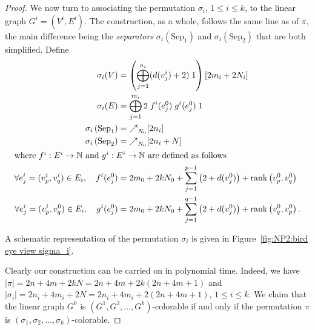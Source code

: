 \begin{proof}
  We now turn to associating the permutation $\sigma_i$, $1 \leq i \leq k$,
  to the linear graph $G^i = (V^i, E^i)$.
  The construction, as a whole, follows the same line as of $\pi$,
  the main difference being the \emph{separators}
  $\sigma_i\left(\text{Sep}_1\right)$ and
  $\sigma_i\left(\text{Sep}_2\right)$ that are both simplified.
  Define
  \begin{align*}
    \sigma_i(V)
    &=
    \left(\bigoplus_{j=1}^{n_i} (d(v^i_j)+2) \; 1\right) [2m_i+2N_i]
    \\
    \sigma_i(E)
    &=
    \bigoplus_{j=1}^{m_i} 2 \; f^i(e^0_j) \; g^i(e^0_j) \; 1
    \\
    \sigma_i\left(\text{Sep}_1\right)
    &=
    \mathbf{\nearrow}_{N_0} [2n_i]
    \\
    \sigma_i\left(\text{Sep}_2\right)
    &=
    \mathbf{\nearrow}_{N_0} [2n_i+N]
    \\
    \intertext{where $f^i : E^i \to \mathbb{N}$ and $g^i : E^i \to \mathbb{N}$
    are defined as follows}
    \forall e^i_j = (v^i_p, v^i_q) \in E_i,\quad f^i(e^0_j)
    &=
    2m_0 + 2kN_0 + \sum_{j=1}^{p-1}\left(2+d(v^0_j)\right) + \operatorname{rank}\left(v^0_p, v^0_q\right)
    \\
    \forall e^i_j = (v^i_p, v^0_q) \in E_i,\quad g^i(e^0_j)
    &=
    2m_0 + 2kN_0 + \sum_{j=1}^{q-1}\left(2+d(v^0_j)\right) + \operatorname{rank}\left(v^0_q, v^0_p\right)\text{.}
    \end{align*}


  A schematic representation of the permutation $\sigma_i$ is given in
  Figure~\ref{fig:NP2:bird eye view sigma_i}.

  Clearly our construction can be carried on in polynomial time.
  Indeed, we have
  $|\pi| = 2n + 4m + 2kN = 2n + 4m + 2k(2n+4m+1)$
  and
  $|\sigma_i| = 2n_i + 4m_i + 2N = 2n_i + 4m_i + 2(2n+4m+1)$,
  $1 \leq i \leq k$.
  We claim that the linear graph $G^0$ is
  $(G^1, G^2, \dots, G^k)$-colorable
  if and only if the permutation
  $\pi$ is $(\sigma_1, \sigma_2, \dots, \sigma_k)$-colorable.


\end{proof}
